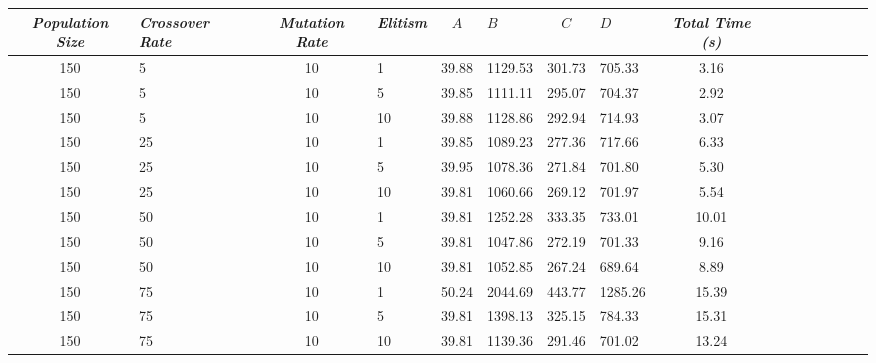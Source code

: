 \begin{center}
\begin{table}[h]
\centering
\footnotesize
{\renewcommand{\arraystretch}{1}}
\begin{tabular}{clclclclclclclc|c}
\textit{Population Size} & \textit{Crossover Rate} & \textit{Mutation Rate} & \textit{Elitism} & $A$ & $B$ & $C$ & $D$ & \textit{Total Time (s)} \\\hline
150 & 5 & 10 & 1 & \cellcolor{gray!50}39.88 & \cellcolor{gray!13}1129.53 & \cellcolor{gray!1}301.73 & \cellcolor{gray!42}705.33 & 3.16\\
150 & 5 & 10 & 5 & \cellcolor{gray!50}39.85 & \cellcolor{gray!16}1111.11 & \cellcolor{gray!1}295.07 & \cellcolor{gray!42}704.37 & 2.92\\
150 & 5 & 10 & 10 & \cellcolor{gray!50}39.88 & \cellcolor{gray!13}1128.86 & \cellcolor{gray!1}292.94 & \cellcolor{gray!39}714.93 & 3.07\\
150 & 25 & 10 & 1 & \cellcolor{gray!50}39.85 & \cellcolor{gray!21}1089.23 & \cellcolor{gray!4}277.36 & \cellcolor{gray!38}717.66 & 6.33\\
150 & 25 & 10 & 5 & \cellcolor{gray!49}39.95 & \cellcolor{gray!23}1078.36 & \cellcolor{gray!10}271.84 & \cellcolor{gray!43}701.80 & 5.30\\
150 & 25 & 10 & 10 & \cellcolor{gray!50}39.81 & \cellcolor{gray!26}1060.66 & \cellcolor{gray!13}269.12 & \cellcolor{gray!43}701.97 & 5.54\\
150 & 50 & 10 & 1 & \cellcolor{gray!50}39.81 & \cellcolor{gray!1}1252.28 & \cellcolor{gray!1}333.35 & \cellcolor{gray!33}733.01 & 10.01\\
150 & 50 & 10 & 5 & \cellcolor{gray!50}39.81 & \cellcolor{gray!28}1047.86 & \cellcolor{gray!10}272.19 & \cellcolor{gray!43}701.33 & 9.16\\
150 & 50 & 10 & 10 & \cellcolor{gray!50}39.81 & \cellcolor{gray!27}1052.85 & \cellcolor{gray!15}267.24 & \cellcolor{gray!47}689.64 & 8.89\\
150 & 75 & 10 & 1 & \cellcolor{gray!1}50.24 & \cellcolor{gray!1}2044.69 & \cellcolor{gray!1}443.77 & \cellcolor{gray!1}1285.26 & 15.39\\
150 & 75 & 10 & 5 & \cellcolor{gray!50}39.81 & \cellcolor{gray!1}1398.13 & \cellcolor{gray!1}325.15 & \cellcolor{gray!17}784.33 & 15.31\\
150 & 75 & 10 & 10 & \cellcolor{gray!50}39.81 & \cellcolor{gray!11}1139.36 & \cellcolor{gray!1}291.46 & \cellcolor{gray!43}701.02 & 13.24\\

\end{tabular}
\end{table}
\end{center}
